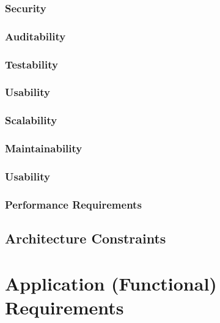\documentclass[12pt]{article}
\begin{document}
	                   	\subsubsection{Security }
	                   	\subsubsection{Auditability}
	                   
	                  	\subsubsection{Testability}
	                  	
	                  	\subsubsection{Usability}
	                  	
	                  	\subsubsection{Scalability}
	                  	
	                  	\subsubsection{Maintainability}
	                  	
	                  	\subsubsection{Usability}
	                  	
	                  	\subsubsection{Performance Requirements}
                	\subsection{Architecture Constraints}
                
                \section{Application (Functional) Requirements}
\end{document}
